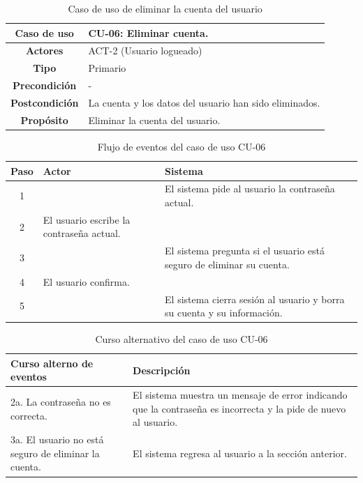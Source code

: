 \begin{table}[H]
\centering
\begin{tabular}{|c|p{10cm}|}
\hline
\rowcolor{green!40} \textbf{Caso de uso} & CU-06: Eliminar cuenta. \\ \hline
\rowcolor{blue!10} \textbf{Actores} & ACT-2 (Usuario logueado) \\ \hline
\rowcolor{blue!10} \textbf{Tipo} & Primario \\ \hline
\rowcolor{blue!10} \textbf{Precondición} & - \\ \hline
\rowcolor{blue!10} \textbf{Postcondición} & La cuenta y los datos del usuario han sido eliminados. \\ \hline
\rowcolor{blue!10} \textbf{Propósito} & Eliminar la cuenta del usuario. \\ \hline
\end{tabular}
\caption{Caso de uso de eliminar la cuenta del usuario}
\end{table}

\begin{table}[H]
\centering
\begin{tabular}{|c|p{5cm}|p{5cm}|}
\hline
\rowcolor{green!40} \textbf{Paso} & \textbf{Actor} & \textbf{Sistema} \\ \hline
\rowcolor{blue!10} 1 &  & El sistema pide al usuario la contraseña actual. \\ \hline
\rowcolor{blue!10} 2 & El usuario escribe la contraseña actual. & \\ \hline
\rowcolor{blue!10} 3 &  & El sistema pregunta si el usuario está seguro de eliminar su cuenta. \\ \hline
\rowcolor{blue!10} 4 & El usuario confirma. & \\ \hline
\rowcolor{blue!10} 5 &  & El sistema cierra sesión al usuario y borra su cuenta y su información. \\ \hline
\end{tabular}
\caption{Flujo de eventos del caso de uso CU-06}
\end{table}

\begin{table}[H]
\centering
\begin{tabular}{|p{4cm}|p{8cm}|}
\hline
\rowcolor{green!40} \textbf{Curso alterno de eventos} & \textbf{Descripción} \\ \hline
\rowcolor{blue!10} 2a. La contraseña no es correcta. & El sistema muestra un mensaje de error indicando que la contraseña es incorrecta y la pide de nuevo al usuario. \\ \hline
\rowcolor{blue!10} 3a. El usuario no está seguro de eliminar la cuenta. & El sistema regresa al usuario a la sección anterior. \\ \hline
\end{tabular}
\caption{Curso alternativo del caso de uso CU-06}
\end{table}

